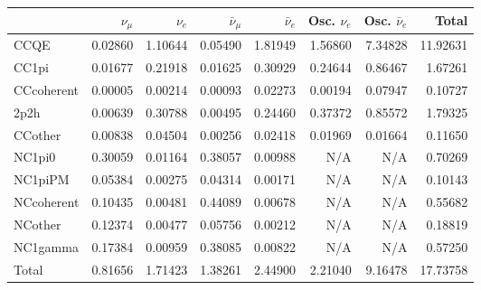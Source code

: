 \begin{tabular} { | l ||r | r | r | r | r | r | | r | }
\hline
              & $\nu_\mu$            & $\nu_e$              & $\bar{\nu}_{\mu}$    & $\bar{\nu}_{e}$      & Osc. $\nu_e$         & Osc. $\bar{\nu}_{e}$ & Total                \\ \hline\hline
 CCQE         & 0.02860              & 1.10644              & 0.05490              & 1.81949              & 1.56860              & 7.34828              & 11.92631             \\ \hline
 CC1pi        & 0.01677              & 0.21918              & 0.01625              & 0.30929              & 0.24644              & 0.86467              & 1.67261              \\ \hline
 CCcoherent   & 0.00005              & 0.00214              & 0.00093              & 0.02273              & 0.00194              & 0.07947              & 0.10727              \\ \hline
 2p2h         & 0.00639              & 0.30788              & 0.00495              & 0.24460              & 0.37372              & 0.85572              & 1.79325              \\ \hline
 CCother      & 0.00838              & 0.04504              & 0.00256              & 0.02418              & 0.01969              & 0.01664              & 0.11650              \\ \hline
 NC1pi0       & 0.30059              & 0.01164              & 0.38057              & 0.00988              & N/A                  & N/A                  & 0.70269              \\ \hline
 NC1piPM      & 0.05384              & 0.00275              & 0.04314              & 0.00171              & N/A                  & N/A                  & 0.10143              \\ \hline
 NCcoherent   & 0.10435              & 0.00481              & 0.44089              & 0.00678              & N/A                  & N/A                  & 0.55682              \\ \hline
 NCother      & 0.12374              & 0.00477              & 0.05756              & 0.00212              & N/A                  & N/A                  & 0.18819              \\ \hline
 NC1gamma     & 0.17384              & 0.00959              & 0.38085              & 0.00822              & N/A                  & N/A                  & 0.57250              \\ \hline
\hline
 Total        & 0.81656              & 1.71423              & 1.38261              & 2.44900              & 2.21040              & 9.16478              & 17.73758             \\ \hline

\end{tabular}
